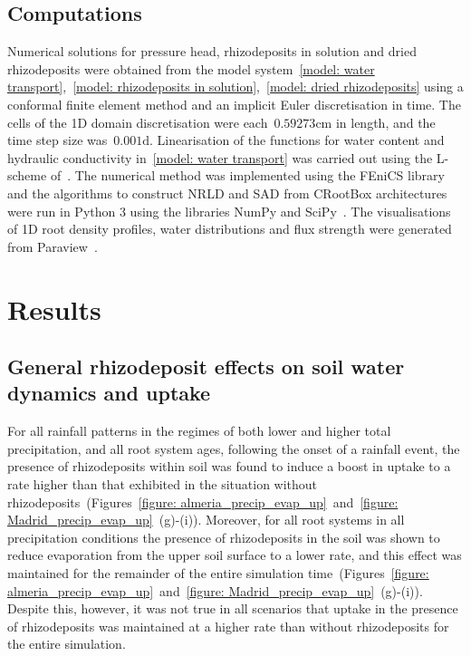 \documentclass[11pt,a4paper]{article}
\numberwithin{equation}{section}
\begin{document}
\subsection{Computations}
Numerical solutions for pressure head, rhizodeposits in solution and dried rhizodeposits were obtained from the model system~\eqref{model: water transport},~\eqref{model: rhizodeposits in solution},~\eqref{model: dried rhizodeposits} using a conformal finite element method and an implicit Euler discretisation in time. The cells of the 1D domain discretisation were each~$0.59273\text{cm}$ in length, and the time step size was~$ 0.001\text{d}$. Linearisation of the functions for water content and hydraulic conductivity in~\eqref{model: water transport} was carried out using the L-scheme of~\cite{list2016study}. The numerical method was implemented using the FEniCS library~\cite{AlnaesBlechta2015a} and the algorithms to construct NRLD and SAD from CRootBox architectures were run in Python 3 using the libraries NumPy and SciPy~\citep{harris2020array}. The visualisations of 1D root density profiles, water distributions and flux strength were generated from Paraview~\citep{ahrens2005paraview}.

\section{Results}

\subsection{General rhizodeposit effects on soil water dynamics and uptake}
For all rainfall patterns in the regimes of both lower and higher total precipitation, and all root system ages, following the onset of a rainfall event, the presence of rhizodeposits within soil was found to induce a boost in uptake to a rate higher than that exhibited in the situation without rhizodeposits~(Figures~\ref{figure: almeria_precip_evap_up}~and~\ref{figure: Madrid_precip_evap_up}~(g)-(i)). 
Moreover, for all root systems in all precipitation conditions the presence of rhizodeposits in the soil was shown to reduce evaporation from the upper soil surface to a lower rate, and this effect was maintained for the remainder of the entire simulation time~(Figures~\ref{figure: almeria_precip_evap_up}~and~\ref{figure: Madrid_precip_evap_up}~(g)-(i)).
Despite this, however, it was not true in all scenarios that uptake in the presence of rhizodeposits was maintained at a higher rate than without rhizodeposits for the entire simulation.
\end{document}
